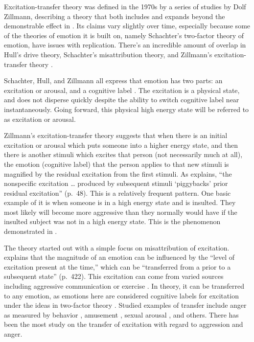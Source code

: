 \documentclass[
  stu]{apa7}
\begin{document}
Excitation-transfer theory was defined in the 1970s by a series of
studies by Dolf Zillmann, describing a theory that both includes and
expands beyond the demonstrable effect in
\textcite{zilEffectResidualExcitation}. Its claims vary slightly over
time, especially because some of the theories of emotion it is built on,
namely Schachter's two-factor theory of emotion, have issues with
replication. There's an incredible amount of overlap in Hull's drive
theory, Schachter's misattribution theory, and Zillmann's
excitation-transfer theory
\autocite{bryExcitationTransferTheoryThreeFactor}.

Schachter, Hull, and Zillmann all express that emotion has two parts: an
excitation or arousal, and a cognitive label
\autocite{bryExcitationTransferTheoryThreeFactor}. The excitation is a
physical state, and does not disperse quickly despite the ability to
switch cognitive label near instantaneously. Going forward, this
physical high energy state will be referred to as excitation or arousal.

Zillmann's excitation-transfer theory suggests that when there is an
initial excitation or arousal which puts someone into a higher energy
state, and then there is another stimuli which excites that person (not
necessarily much at all), the emotion (cognitive label) that the person
applies to that new stimuli is magnified by the residual excitation from
the first stimuli. As \textcite{bryExcitationTransferTheoryThreeFactor}
explains, ``the nonspecific excitation \ldots{} produced by subsequent
stimuli `piggybacks' prior residual excitation'' (p.~48). This is a
relatively frequent pattern. One basic example of it is when someone is
in a high energy state and is insulted. They most likely will become
more aggressive than they normally would have if the insulted subject
was not in a high energy state. This is the phenomenon demonstrated in
\textcite{zilEffectResidualExcitation}.

The theory started out with a simple focus on misattribution of
excitation. \textcite{zilExcitationTransferCommunicationmediated}
explains that the magnitude of an emotion can be influenced by the
``level of excitation present at the time,'' which can be ``transferred
from a prior to a subsequent state'' (p.~422). This excitation can come
from varied sources including aggressive communication
\autocite{zilExcitationTransferCommunicationmediated} or exercise
\autocite{zilExcitationTransferPhysical}. In theory, it can be
transferred to any emotion, as emotions here are considered cognitive
labels for excitation under the ideas in two-factor theory \autocite[
421]{zilExcitationTransferCommunicationmediated}. Studied examples of
transfer include anger as measured by behavior
\autocite{zilExcitationTransferCommunicationmediated}, amusement
\autocite{canEnhancementHumorAppreciation}, sexual arousal
\autocite{canEnhancementExperiencedSexual}, and others. There has been
the most study on the transfer of excitation with regard to aggression
and anger.
\end{document}
